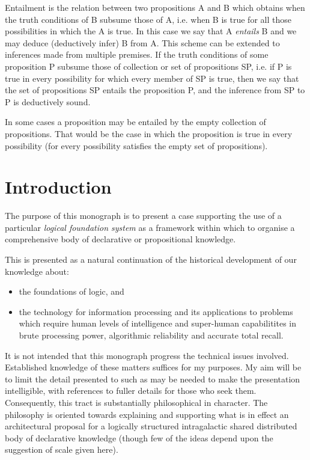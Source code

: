 \documentclass[10pt,titlepage]{book}
\begin{document}
Entailment is the relation between two propositions A and B which obtains when the truth conditions of B subsume those of A, i.e. when B is true for all those possibilities in which the A is true.
In this case we say that A \emph{entails} B and we may deduce (deductively infer) B from A.
This scheme can be extended to inferences made from multiple premises.
If the truth conditions of some proposition P subsume those of collection or set of propositions SP, i.e. if P is true in every possibility for which every member of SP is true, then we say that the set of propositions SP entails the proposition P, and the inference from SP to P is deductively sound.

In some cases a proposition may be entailed by the empty collection of propositions.
That would be the case in which the proposition is true in every possibility (for every possibility satisfies the empty set of propositions).





\chapter{Introduction}

The purpose of this monograph is to present a case supporting the use of a particular \emph{logical foundation system} as a framework within which to organise a comprehensive body of declarative or propositional knowledge.

This is presented as a natural continuation of the historical development of our knowledge about:
\begin{itemize}
\item the foundations of logic, and
\item the technology for information processing and its applications to problems which require human levels of intelligence and super-human capabilitites in brute processing power, algorithmic reliability and accurate total recall.
\end{itemize}

It is not intended that this monograph progress the technical issues involved.
Established knowledge of these matters suffices for my purposes.
My aim will be to limit the detail presented to such as may be needed to make the presentation intelligible, with references to fuller details for those who seek them.
Consequently, this tract is substantially philosophical in character.
The philosophy is oriented towards explaining and supporting what is in effect an architectural proposal for a  logically structured intragalactic shared distributed body of declarative knowledge (though few of the ideas depend upon the suggestion of scale given here).
\end{document}
